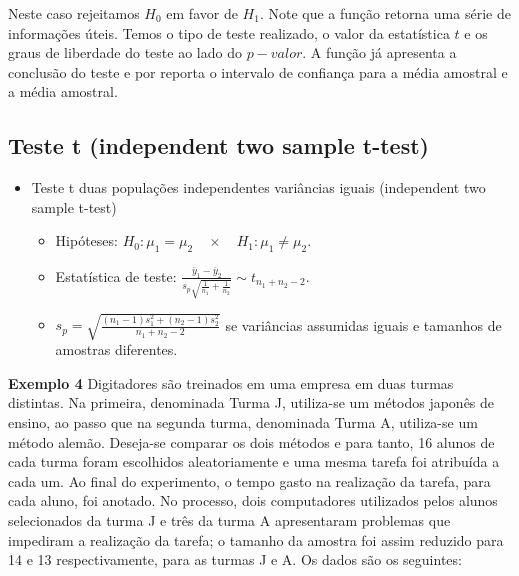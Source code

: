 \documentclass[10pt,a4paper]{book}
\providecommand{\tightlist}{%
  \setlength{\itemsep}{0pt}\setlength{\parskip}{0pt}}
\begin{document}
Neste caso rejeitamos \(H_0\) em favor de \(H_1\). Note que a função
retorna uma série de informações úteis. Temos o tipo de teste realizado,
o valor da estatística \(t\) e os graus de liberdade do teste ao lado do
\(p-valor\). A função já apresenta a conclusão do teste e por reporta o
intervalo de confiança para a média amostral e a média amostral.

\subsection{Teste t (independent two sample
t-test)}\label{teste-t-independent-two-sample-t-test}

\begin{itemize}
\tightlist
\item
  Teste t duas populações independentes variâncias iguais (independent
  two sample t-test)

  \begin{itemize}
  \tightlist
  \item
    Hipóteses:
    \(H_0: \mu_1 = \mu_2 \quad \times \quad H_1: \mu_1 \neq \mu_2.\)
  \item
    Estatística de teste:
    \(\frac{\bar{y}_1 - \bar{y}_2}{s_p \sqrt{\frac{1}{n_1} + \frac{1}{n_2}}} \sim t_{n_1 + n_2-2}.\)
  \item
    \(s_p = \sqrt{\frac{(n_1 - 1)s^2_1 + (n_2 - 1)s^2_2}{n_1 + n_2 -2}}\)
    se variâncias assumidas iguais e tamanhos de amostras diferentes.
  \end{itemize}
\end{itemize}

\textbf{Exemplo 4} Digitadores são treinados em uma empresa em duas
turmas distintas. Na primeira, denominada Turma J, utiliza-se um métodos
japonês de ensino, ao passo que na segunda turma, denominada Turma A,
utiliza-se um método alemão. Deseja-se comparar os dois métodos e para
tanto, 16 alunos de cada turma foram escolhidos aleatoriamente e uma
mesma tarefa foi atribuída a cada um. Ao final do experimento, o tempo
gasto na realização da tarefa, para cada aluno, foi anotado. No
processo, dois computadores utilizados pelos alunos selecionados da
turma J e três da turma A apresentaram problemas que impediram a
realização da tarefa; o tamanho da amostra foi assim reduzido para 14 e
13 respectivamente, para as turmas J e A. Os dados são os seguintes:
\end{document}
